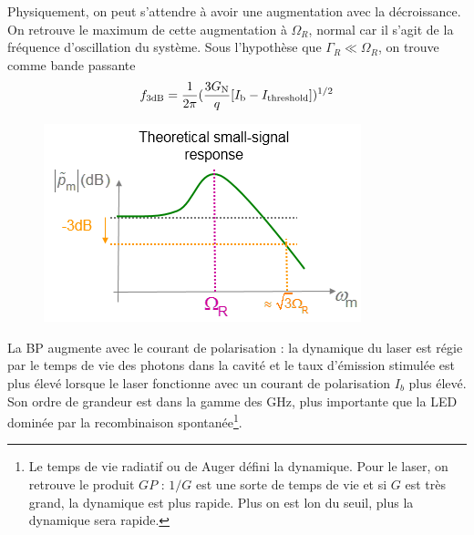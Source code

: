 Physiquement, on peut s'attendre à avoir une augmentation avec la décroissance. On retrouve le
maximum de cette augmentation à $\Omega_R$, normal car il s'agit de la fréquence d'oscillation du
système. Sous l'hypothèse que $\Gamma_R \ll \Omega_R$, on trouve comme bande passante
\begin{equation}
{f_{{\rm{3dB}}}} = \frac{1}{{2\pi }}{(\frac{{3{G_{\rm{N}}}}}{q}[{I_{\rm{b}}} - {I_{{\rm{threshold}}}}])^{1/2}}
\end{equation}
	\begin{figure}
	\vspace{-5mm}
	\includegraphics[scale=0.6]{ch4/image25}
	\end{figure}
La BP augmente avec le courant de polarisation : la dynamique du laser est régie par le temps de vie
des photons dans la cavité et le taux d'émission stimulée est plus élevé lorsque le laser fonctionne
avec un courant de polarisation $I_b$ plus élevé. Son ordre de grandeur est dans la gamme des GHz, plus
importante que la LED dominée par la recombinaison spontanée\footnote{Le temps de vie radiatif ou de
Auger défini la dynamique. Pour le laser, on retrouve le produit $GP$ : $1/G$ est une sorte de 
temps de vie et si $G$ est très grand, la dynamique est plus rapide. Plus on est lon du seuil, 
plus la dynamique sera rapide.}.



